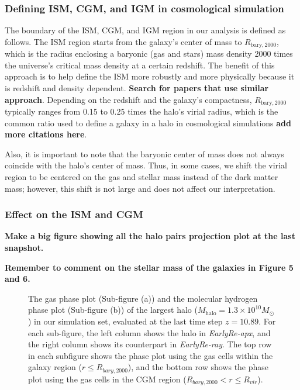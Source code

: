 \documentclass[linenumbers, twocolumn]{aastex631}
\begin{document}
\subsubsection{Defining ISM, CGM, and IGM in cosmological simulation}

The boundary of the ISM, CGM, and IGM region in our analysis is defined as follows. The ISM region starts from the galaxy's center of mass to $R_{\mathrm{bary}, 2000}$, which is the radius enclosing a baryonic (gas and stars) mass density 2000 times the universe's critical mass density at a certain redshift. The benefit of this approach is to help define the ISM more robustly and more physically because it is redshift and density dependent. \textbf{Search for papers that use similar approach}. Depending on the redshift and the galaxy's compactness, $R_{\mathrm{bary}, 2000}$ typically ranges from 0.15 to 0.25 times the halo's virial radius, which is the common ratio used to define a galaxy in a halo in cosmological simulations \citep{Strawn+2024} \textbf{add more citations here}. 

Also, it is important to note that the baryonic center of mass does not always coincide with the halo's center of mass. Thus, in some cases, we shift the virial region to be centered on the gas and stellar mass instead of the dark matter mass; however, this shift is not large and does not affect our interpretation.    

\subsubsection{Effect on the ISM and CGM}

\textbf{Make a big figure showing all the halo pairs projection plot at the last snapshot.}

\textbf{Remember to comment on the stellar mass of the galaxies in Figure 5 and 6.}

\begin{figure}
    \caption{The gas phase plot (Sub-figure (a)) and the molecular hydrogen phase plot (Sub-figure (b)) of the largest halo ($M_{\mathrm{halo}} = 1.3\times10^{10} M_\odot$) in our simulation set, evaluated at the last time step $z = 10.89$. For each sub-figure, the left column shows the halo in \textit{EarlyRe-apx}, and the right column shows its counterpart in \textit{EarlyRe-ray}. The top row in each subfigure shows the phase plot using the gas cells within the galaxy region ($r \leq R_{bary,2000}$), and the bottom row shows the phase plot using the gas cells in the CGM region ($R_{bary,2000} < r \leq R_{vir}$).} 
    \label{fig:phaseplot_Halo0-0}
\end{figure}
\end{document}
